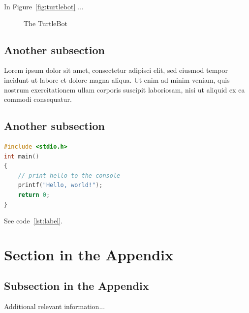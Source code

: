 \documentclass[english]{article}
\begin{document}
In Figure~\ref{fig:turtlebot} ...

\begin{figure}[!ht]
	\centering
	\caption{The TurtleBot}
\end{figure}

\subsection{Another subsection}

Lorem ipsum dolor sit amet, consectetur adipisci elit, sed eiusmod tempor incidunt ut labore et dolore magna aliqua. Ut enim ad minim veniam, quis nostrum exercitationem ullam corporis suscipit laboriosam, nisi ut aliquid ex ea commodi consequatur.

\subsection{Another subsection}

\begin{lstlisting}[language=C, caption={C code using listings}, label={lst:label} ]
#include <stdio.h>
int main()
{
	// print hello to the console
	printf("Hello, world!");
	return 0;
}
\end{lstlisting}

See code~\ref{lst:label}.




\clearpage
\appendix

\section{Section in the Appendix}
\label{sec:app1}

\subsection{Subsection in the Appendix}
\label{subsec:app2}

Additional relevant information...
\end{document}
